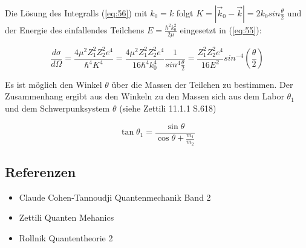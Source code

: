 Die Lösung des Integralls (\ref{eq:56}) mit \(k_0=k\) folgt \(K = |\vec k_0-\vec k| = 2k_0 sin\frac{\theta}{2} \) und  der Energie des einfallendes Teilchens \(E=\frac{\hbar^2k_0^2}{2\mu}\)  eingesetzt in (\ref{eq:55}):

\begin{equation}
  \label{eq:57}
  \frac{d\sigma}{d\Omega}=  \frac{4\mu^2Z_1^2Z_2^2e^4}{\hbar^4 K^4} = \frac{4\mu^2Z_1^2Z_2^2e^4}{16 \hbar^4 k_0^4}\frac{1}{sin^4\frac{\theta}{2} } = \frac{Z_1^2Z_2^2e^4}{16 E^2}sin^{-4}(\frac{\theta}{2})
\end{equation}


Es ist möglich den Winkel \(\theta\) über die Massen der Teilchen zu bestimmen. Der Zusammenhang ergibt aus den Winkeln  zu den Massen sich aus dem Labor \(\theta_1\) und dem Schwerpunksystem \(\theta\) (siehe Zettili 11.1.1 S.618)

\begin{equation}
  \label{eq:58}
  \tan\theta_1=\frac{\sin\theta}{\cos\theta+\frac{m_1}{m_2}}
\end{equation}






\subsection*{Referenzen}
\begin{itemize}
\item Claude Cohen-Tannoudji Quantenmechanik Band 2
\item Zettili Quanten Mehanics
\item Rollnik Quantentheorie 2
\end{itemize}


